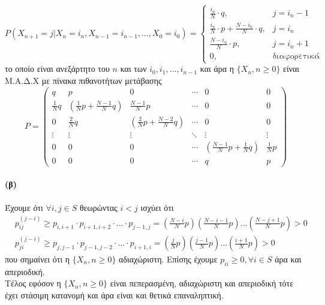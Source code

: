 \documentclass[a4paper,11pt]{article}
\begin{document}
\[
	P(X_{n+1} = j|X_n = i_n, X_{n-1} = i_{n-1}, \dots , X_0 = i_0) =
		\begin{cases}
			\frac{i_n}{N} \cdot q, & j = i_n-1\\
			\frac{i_n}{N} \cdot p + \frac{N-i_n}{N} \cdot q, & j = i_n\\
			\frac{N-i_n}{N} \cdot p, & j = i_n+1\\
			0, & \text{διαφορετικά}
		\end{cases}
\]
το οποίο είναι ανεξάρτητο του $n$ και των $i_0,i_1,\dots , i_{n-1}$ και άρα η $\{X_n, n \geq 0\}$ είναι Μ.Α.Δ.Χ με πίνακα πιθανοτήτων μετάβασης
\[
	P =
		\begin{pmatrix}
			q & p & 0 & \cdots & 0 & 0\\[1em]
			\frac{1}{N} q & \left(\frac{1}{N}p + \frac{N-1}{N}q\right) & \frac{N-1}{N} p & \cdots & 0 & 0\\[1em]
			0 & \frac{2}{N} q & \left(\frac{2}{N}p + \frac{N-2}{N}q\right) & \cdots & 0 & 0\\[1em]
			\vdots & \vdots & \vdots & \ddots & \vdots & \vdots\\[1em]
			0 & 0 & 0 & \cdots & \left(\frac{N-1}{N}p + \frac{1}{N}q\right) & \frac{1}{N} p\\[1em]
			0 & 0 & 0 & \cdots & q & p
		\end{pmatrix}
\]

\paragraph{(β)}
Έχουμε ότι $\forall i,j \in S$ θεωρώντας $i < j$ ισχύει ότι
\begin{align*}
	&p_{ij}^{(j-i)} \geq p_{i,i+1} \cdot p_{i+1,i+2} \cdot \dots \cdot p_{j-1,j} = \left(\frac{N-i}{N}p\right) \left(\frac{N-i-1}{N}p\right) \dots \left(\frac{N-j+1}{N}p\right) > 0\\
	&p_{ji}^{(j-i)} \geq p_{j,j-1} \cdot p_{j-1,j-2} \cdot \dots \cdot p_{i+1,i} = \left(\frac{j}{N}p\right) \left(\frac{j-1}{N}p\right) \dots \left(\frac{i+1}{N}p\right) > 0
\end{align*}
που σημαίνει ότι η $\{X_n,n\geq 0\}$ αδιαχώριστη.
Επίσης έχουμε $p_{ii} \geq 0, \forall i \in S$ άρα και απεριοδική.
\\[8pt]
Τέλος εφόσον η $\{X_n,n\geq 0\}$ είναι πεπερασμένη, αδιαχώριστη και απεριοδική τότε έχει στάσιμη κατανομή και άρα είναι και θετικά επαναληπτική.
\end{document}
